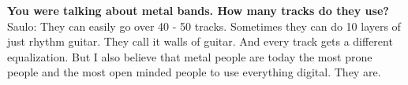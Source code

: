 \textbf{You were talking about metal bands. How many tracks do they use?}
\newline Saulo: They can easily go over 40 - 50 tracks. Sometimes they can do 10 layers of just rhythm guitar. They call it walls of guitar. And every track gets a different equalization.
But I also believe that metal people are today the most prone people and the most open minded people to use everything digital. They are.
